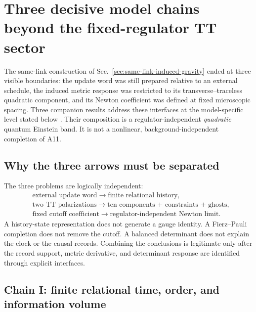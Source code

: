 \section{Three decisive model chains beyond the fixed-regulator TT sector}
\label{sec:three-decisive-chains}

The same-link construction of
Sec.~\ref{sec:same-link-induced-gravity} ended at three visible boundaries:
the update word was still prepared relative to an external schedule, the
induced metric response was restricted to its transverse--traceless
quadratic component, and its Newton coefficient was defined at fixed
microscopic spacing.  Three companion results address these interfaces at
the model-specific level stated below
\cite{XuRelationalOrderVolume2026,XuConstraintCompleteEinstein2026,
XuRegulatorIndependentNewton2026}.  Their composition is a
regulator-independent \emph{quadratic} quantum Einstein band.  It is not a
nonlinear, background-independent completion of A11.

\subsection{Why the three arrows must be separated}

The three problems are logically independent:
\begin{equation}
\begin{split}
&\text{external update word}
 \longrightarrow \text{finite relational history},\\
&\text{two TT polarizations}
 \longrightarrow \text{ten components + constraints + ghosts},\\
&\text{fixed cutoff coefficient}
 \longrightarrow \text{regulator-independent Newton limit}.
\end{split}
\label{eq:three-chain-separation}
\end{equation}
A history-state representation does not generate a gauge identity.  A
Fierz--Pauli completion does not remove the cutoff.  A balanced determinant
does not explain the clock or the causal records.  Combining the conclusions
is legitimate only after the record support, metric derivative, and
determinant response are identified through explicit interfaces.

\subsection{Chain I: finite relational time, order, and information volume}

